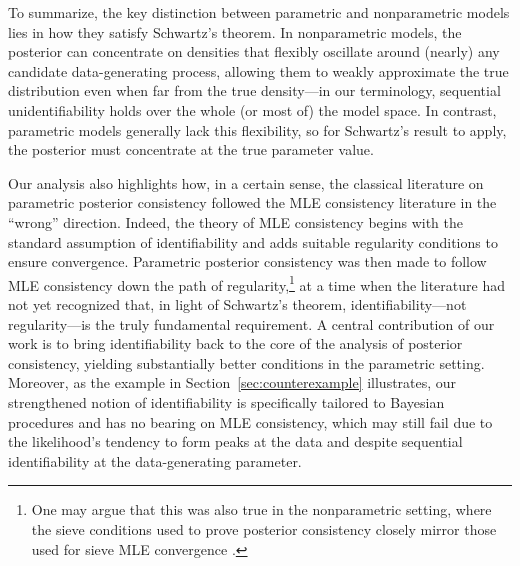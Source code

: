 \documentclass[11pt,twoside]{article}
\begin{document}
To summarize, the key distinction between parametric and nonparametric models lies in how they satisfy Schwartz’s theorem. In nonparametric models, the posterior can concentrate on densities that flexibly oscillate around (nearly) any candidate data-generating process, allowing them to weakly approximate the true distribution even when far from the true density—in our terminology, sequential unidentifiability holds over the whole (or most of) the model space. In contrast, parametric models generally lack this flexibility, so for Schwartz’s result to apply, the posterior must concentrate at the true parameter value.



Our analysis also highlights how, in a certain sense, the classical literature on parametric posterior consistency followed the MLE consistency literature in the ``wrong'' direction. Indeed, the theory of MLE consistency begins with the standard assumption of identifiability and adds suitable regularity conditions to ensure convergence. Parametric posterior consistency was then made to follow MLE consistency down the path of regularity,\footnote{One may argue that this was also true in the nonparametric setting, where the sieve conditions used to prove posterior consistency closely mirror those used for sieve MLE convergence \citep[e.g., see][]{wong1995probability, shen1994convergence, vandegeer2000empirical}.} at a time when the literature had not yet recognized that, in light of Schwartz's theorem, identifiability—not regularity—is the truly fundamental requirement. A central contribution of our work is to bring identifiability back to the core of the analysis of posterior consistency, yielding substantially better conditions in the parametric setting. Moreover, as the example in Section~\ref{sec:counterexample} illustrates, our strengthened notion of identifiability is specifically tailored to Bayesian procedures and has no bearing on MLE consistency, which may still fail due to the likelihood’s tendency to form peaks at the data and despite sequential identifiability at the data-generating parameter.
\end{document}
